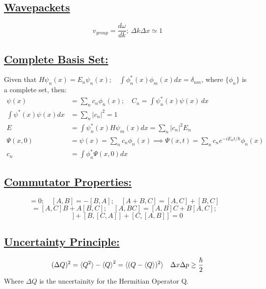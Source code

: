 \documentclass[a4paper,12pt]{article}
\begin{document}
\subsection*{\underline{Wavepackets}}
\begin{equation}
    v_{group} =\frac{d\omega}{dk};\  \Delta k\Delta x \simeq 1
\end{equation}
\subsection*{\underline{Complete Basis Set:}}
Given that $H\psi_n(x)=E_n\psi_n(x);\quad \int\phi^*_n(x)\phi_m(x)dx=\delta_{nm}$, where $\{\phi_n\}$ is a complete set, then:
\begin{align}
    \psi(x)&=\sum_nc_n\phi_n(x);\quad C_n=\int\psi^*_n(x)\psi(x)\,dx\\
    \int\psi^*(x)\psi(x)dx&=\sum_n|c_n|^2=1\\
    E&=\int\psi^*_n(x)H\psi_m(x)dx=\sum_n|c_n|^2E_n\\
    \Psi(x,0)&=\psi(x)=\sum_nc_n\phi_n(x)\implies\Psi(x,t)=\sum_nc_ne^{-iE_nt/\hbar}\phi_n(x)\\
    c_n&=\int\phi_n^*\Psi(x,0)dx
\end{align}
\subsection*{\underline{Commutator Properties:}}
\begin{equation}
[A,A]=0;\quad
[A,B]=-[B,A];\quad
[A+B,C]=[A,C]+[B,C]\quad
\end{equation}
\begin{equation}
[AB,C]=[A,C]B+A[B,C];\quad
[A,BC]=[A,B]C+B[A,C];\quad
\end{equation}
\begin{equation}
[A,[B,C]]+[B,[C,A]]+[C,[A,B]]=0
\end{equation}
\subsection*{\underline{Uncertainty Principle:}}
\begin{align}
    &(\Delta Q)^2 = \braket{Q^2} - \braket{Q}^2 = \braket{(Q-\braket{Q})^2}
    &\Delta x \Delta p \geq \frac{\hbar}{2}
\end{align}
Where $\Delta Q$ is the uncertainity for the Hermitian Operator Q.
\end{document}

